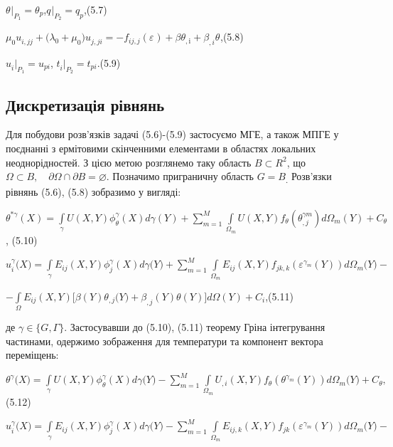 $\theta^{}{|_{P_{1}} = \theta_{p}}$,\emph{}$q^{}{|_{P_{2}} = q_{p}}$,(5.7)

$\mu_{0}{u_{i,\mathit{\text{jj}}}^{} + (}{\lambda_{0} + \mu_{0}}){u_{j,\mathit{\text{ji}}}^{} = {- f_{\mathit{\text{ij}},j}}}(\varepsilon^{}) + \beta\theta_{\mathrm{,i}}^{\mathrm{}} + \beta_{,i}\theta^{}$,(5.8)

$u_{i}^{}{|_{P_{1}} = u_{\mathit{\text{pi}}}}$,
$t_{i}^{}{|_{P_{2}} = t_{\mathit{\text{pi}}}}$.(5.9)

\subsection{Дискретизація рівнянь}

Для побудови розв'язків задачі (5.6)-(5.9) застосуємо МГЕ, а також МПГЕ у поєднанні з ермітовими скінченними елементами
в областях локальних неоднорідностей. З цією метою розглянемо таку область $B\subset R^{2}$, що $\Omega\subset
B,\quad\partial{\Omega \cap \partial}{B = \varnothing}$. Позначимо приграничну область $G = B$\textsubscript{.
}Розв'язки рівнянь (5.6), (5.8) зобразимо у вигляді:

$\theta^{*\gamma}(X) = \int\limits_\gamma U(X,Y)\phi_{\theta}^{\gamma}(X)d\gamma(Y) + 
\sum\limits_{m = 1}^{M}\int\limits_{\Omega_{m}}U(X,Y)f_\theta(\theta_{,j}^{\gamma m})d\Omega_{m}(Y) + C_{\theta}$, (5.10)

$u_{i}^{\gamma}(X{) = {\int\limits_{\gamma}{E_{\mathit{\text{ij}}}(X,Y)\phi_{j}^{\gamma}(X)\mathit{d\gamma}(Y{) + {\sum\limits_{m = 1}^{M}{\int\limits_{\Omega_{m}}{E_{\mathit{\text{ij}}}(X,Y)f_{\mathit{\text{jk}},k}(\varepsilon^{\gamma_{m}}(Y))d\Omega_{m}{(Y{) -}}}}}}}}}$

${- {\int\limits_{\Omega}{E_{\mathit{\text{ij}}}(X,Y)\lbrack\beta(Y)\theta_{,j}(Y{) + \beta_{,j}}(Y)\theta(Y)\rbrack d\Omega(Y)}}} + C_{i}$,(5.11)

\noindent де $\gamma\in \{G,\Gamma\}$. Застосувавши до (5.10), (5.11) теорему Гріна інтегрування частинами,
одержимо зображення для температури та компонент вектора переміщень:

$\theta^{\gamma}(X{) = {\int\limits_{\gamma}{U(X,Y)\phi_{\theta}^{\gamma}(X)\mathit{d\gamma}(Y{) - {\sum\limits_{m = 1}^{M}{{\int\limits_{\Omega_{m}}{U_{,i}(X,Y)f_{\theta}(\theta^{\gamma_{m}}(Y))d\Omega_{m}{(Y{) + C_{\theta}}}}},}}}}}}$
(5.12)

$u_{i}^{\gamma}(X{) = {\int\limits_{\gamma}{E_{\mathit{\text{ij}}}(X,Y)\phi_{j}^{\gamma}(X)\mathit{d\gamma}(Y{) - {\sum\limits_{m = 1}^{M}{\int\limits_{\Omega_{m}}{E_{\mathit{\text{ij}},k}(X,Y)f_{\mathit{\text{jk}}}(\varepsilon^{\gamma_{m}}(Y))d\Omega_{m}{(Y{) -}}}}}}}}}$

